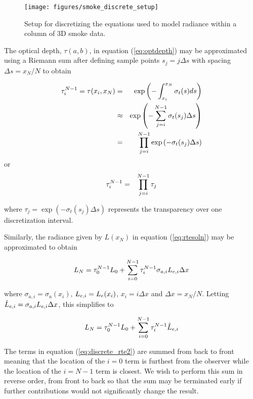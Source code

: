 \begin{figure}[\figoptions]
\begin{center}
\texttt{[image: figures/smoke\_discrete\_setup]}
\end{center}
\caption {Setup for discretizing the equations used to model
radiance within a column of 3D smoke data.}
\label{fig:smokediscretesetup}
\end{figure}

The optical depth, $\tau(a,b)$, in equation (\ref{eq:optdepth}) may be approximated using a Riemann sum  after defining sample points $s_j=j\Delta s$ with spacing $\Delta s=x_N/N$ to obtain

\begin{eqnarray*}
\tau_{i}^{N-1}=\tau(x_i,x_N)&=&\exp\left(-\int_{x_i}^{x_N}\sigma_t(s)ds\right)\\
&\approx&\exp\left(-\sum_{j=i}^{N-1}\sigma_t(s_j)\Delta s\right)\\
&=&\prod_{j=i}^{N-1}\exp\left(-\sigma_t(s_j)\Delta s\right)
\end{eqnarray*}
or
\begin{eqnarray}
\label{eq:tauhat_discrete}
\tau_{i}^{N-1}&=&\prod_{j=i}^{N-1}\tau_j
\end{eqnarray}

where $\tau_j=\exp\left(-\sigma_t(s_j)\Delta s\right)$ represents the transparency over one discretization interval.

Similarly, the radiance given by $L(x_N)$ in equation (\ref{eq:rtesoln}) may be approximated to obtain

\begin{equation}
\label{eq:discrete_rte}
L_{N} = \tau_{0}^{N-1}L_0 +
\sum_{i=0}^{N-1}\tau_{i}^{N-1}\sigma_{a,i}L_{e,i}\Delta x
\end{equation}

where $\sigma_{a,i}=\sigma_a(x_i)$, $L_{e,i}=L_e(x_i)$, $x_i=i\Delta x$ and $\Delta x=x_N/N$. 
Letting $\hat{L}_{e,i}=\sigma_{a,i}L_{e,i}\Delta x$, this simplifies to

\begin{equation}
\label{eq:discrete_rte2}
L_N = \tau_{0}^{N-1}L_0 + \sum_{i=0}^{N-1}\tau_{i}^{N-1}\hat{L}_{e,i}
\end{equation}

The terms in equation (\ref{eq:discrete_rte2}) are summed from back to front meaning that the location of the $i=0$ term is furthest from the observer while the location of the $i=N-1$ term is closest.  We wish to perform this sum in reverse order, from front to back so that the sum may be terminated early if further contributions would not significantly change the result.

